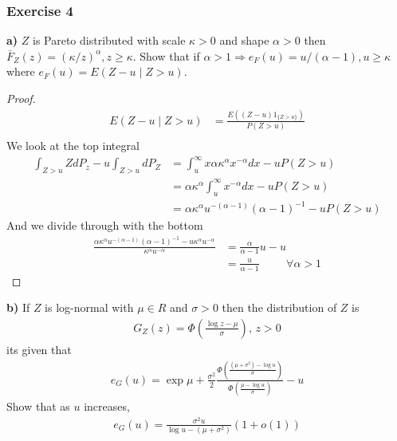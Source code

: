 \documentclass{article}
\begin{document}
\subsubsection{Exercise 4}
\textbf{a)}
$Z$ is Pareto distributed with scale $\kappa > 0$ and shape $\alpha > 0 $ then $\bar{F}_Z(z) = (\kappa / z )^{\alpha}, z \geq \kappa$.
Show that if $\alpha > 1 \Rightarrow e_F(u) = u / (\alpha -1), u \geq \kappa$ where $e_F(u) = E(Z-u \mid Z  > u)$. 
\begin{proof}
\begin{align*}
    E(Z-u \mid Z > u) &= \frac{E((Z-u)1_{\{ Z > u \}})}{P(Z > u)}\\
\end{align*}
We look at the top integral
\begin{align*}
    \int_{Z > u} Z dP_z - u \int_{Z>u}dP_Z &= \int_u^\infty x \alpha \kappa^\alpha x^{-\alpha} dx - uP(Z > u) \\
    &= \alpha \kappa^\alpha \int_u^\infty x^{-\alpha} dx -u P(Z>u)\\
    &= \alpha \kappa^\alpha u^{-(\alpha -1)}(\alpha -1)^{-1} - u P(Z>u) 
\end{align*}
And we divide through with the bottom
\begin{align*}
   \frac{\alpha \kappa^\alpha u^{-(\alpha -1)}(\alpha -1)^{-1} - u \kappa^\alpha  u^{-\alpha}}{\kappa^\alpha  u^{-\alpha}} 
   &= \frac{\alpha}{\alpha - 1}u - u \\
   &= \frac{u}{\alpha - 1} \hspace{1cm} \forall \alpha > 1
\end{align*}
\end{proof}
\textbf{b)}
If $Z$ is log-normal with $\mu \in R$ and $\sigma > 0$ then the distribution of $Z$ is 
\begin{align*}
    G_Z(z) = \Phi\left( \frac{\log z - \mu}{\sigma} \right), \, z > 0
\end{align*}
its given that 
\begin{align*}
    e_G(u) = \exp{\mu + \frac{\sigma^2}{2}} \frac{\Phi\left( \frac{(\mu + \sigma^2) - \log u}{\sigma} \right)}{\Phi\left( \frac{\mu - \log u}{\sigma}\right)} - u 
\end{align*}
Show that as $u$ increases, 
\begin{align*}
    e_G(u) = \frac{\sigma^2 u }{\log u - (\mu + \sigma^2)} (1+ o(1))
\end{align*}
\end{document}
